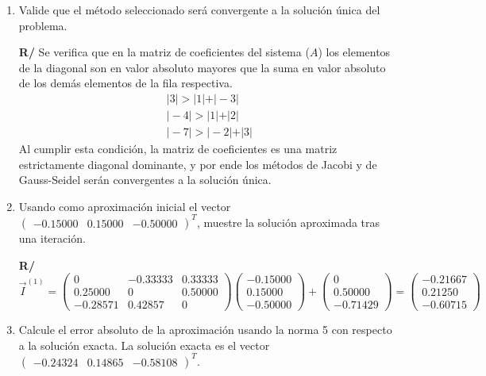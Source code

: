 \documentclass[12pt]{article}
\begin{document}
\begin{enumerate}[leftmargin=*,widest=9]
{\begin{enumerate}[label=\alph*]
\[   \]
   \[
\vec{c}_J = \begin{pmatrix} 3 & 0 & 0\\ 0 & -4 & 0\\ 0 & 0 & -7 \end{pmatrix}^{-1}\begin{pmatrix} 0 \\ -2 \\ 5 \end{pmatrix} =
\begin{pmatrix} 0\\ 0.50000 \\ -0.71429 \end{pmatrix}
   \]
   \item Valide que el método seleccionado será convergente a la solución única del problema.

   \textbf{R/} Se verifica que en la matriz de coeficientes del sistema (\(A\)) los elementos de la diagonal son en valor absoluto mayores que la suma en valor absoluto de los demás elementos de la fila respectiva.
   \begin{eqnarray*}
   \vert 3 \vert > \vert 1 \vert + \vert -3 \vert \\
   \vert -4 \vert > \vert 1 \vert + \vert 2 \vert \\
   \vert -7 \vert > \vert -2 \vert + \vert 3 \vert
   \end{eqnarray*}
   Al cumplir esta condición, la matriz de coeficientes es una matriz estrictamente diagonal dominante, y por ende los métodos de Jacobi y de Gauss-Seidel serán convergentes a la solución única.
   \item Usando como aproximación inicial el vector \( \begin{pmatrix} -0.15000 & 0.15000 & -0.50000 \end{pmatrix}^T \), muestre la solución aproximada tras una iteración.

   \textbf{R/}
   \[
\vec{I}^{(1)} = \begin{pmatrix}0 & -0.33333 & 0.33333\\ 0.25000 & 0 & 0.50000\\ -0.28571 & 0.42857 & 0 \end{pmatrix}\begin{pmatrix} -0.15000\\ 0.15000\\ -0.50000 \end{pmatrix} + \begin{pmatrix} 0\\ 0.50000 \\ -0.71429 \end{pmatrix} = \begin{pmatrix}-0.21667\\0.21250\\-0.60715\end{pmatrix}
   \]
   \item Calcule el error absoluto de la aproximación usando la norma 5 con respecto a la solución exacta. La solución exacta es el vector
   \( \begin{pmatrix} -0.24324 & 0.14865 & -0.58108 \end{pmatrix}^T \).


\end{enumerate}}
\end{enumerate}
\end{document}
